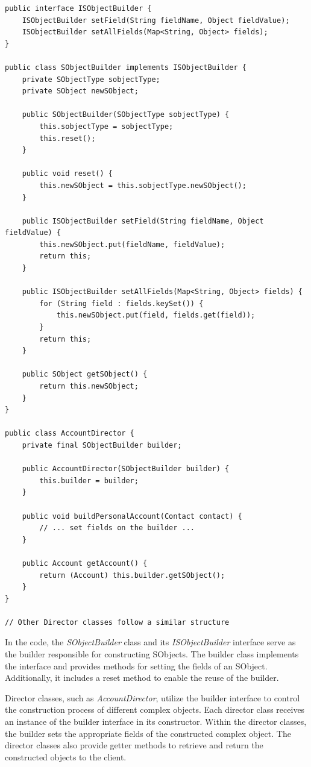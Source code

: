 \documentclass[12pt]{article}
\begin{document}
\begin{lstlisting}
public interface ISObjectBuilder {
    ISObjectBuilder setField(String fieldName, Object fieldValue);
    ISObjectBuilder setAllFields(Map<String, Object> fields);
}

public class SObjectBuilder implements ISObjectBuilder {
    private SObjectType sobjectType;
    private SObject newSObject;

    public SObjectBuilder(SObjectType sobjectType) {
        this.sobjectType = sobjectType;
        this.reset();
    }

    public void reset() {
        this.newSObject = this.sobjectType.newSObject();
    }

    public ISObjectBuilder setField(String fieldName, Object fieldValue) {
        this.newSObject.put(fieldName, fieldValue);
        return this;
    }

    public ISObjectBuilder setAllFields(Map<String, Object> fields) {
        for (String field : fields.keySet()) {
            this.newSObject.put(field, fields.get(field));
        }
        return this;
    }

    public SObject getSObject() {
        return this.newSObject;
    }
}

public class AccountDirector {
    private final SObjectBuilder builder;

    public AccountDirector(SObjectBuilder builder) {
        this.builder = builder;
    }

    public void buildPersonalAccount(Contact contact) {
        // ... set fields on the builder ...
    }

    public Account getAccount() {
        return (Account) this.builder.getSObject();
    }
}

// Other Director classes follow a similar structure
\end{lstlisting}

In the code, the \textit{SObjectBuilder} class and its \textit{ISObjectBuilder} interface serve as the builder responsible for constructing SObjects. The builder class implements the interface and provides methods for setting the fields of an SObject. Additionally, it includes a reset method to enable the reuse of the builder.

Director classes, such as \textit{AccountDirector}, utilize the builder interface to control the construction process of different complex objects. Each director class receives an instance of the builder interface in its constructor. Within the director classes, the builder sets the appropriate fields of the constructed complex object. The director classes also provide getter methods to retrieve and return the constructed objects to the client.
\end{document}
